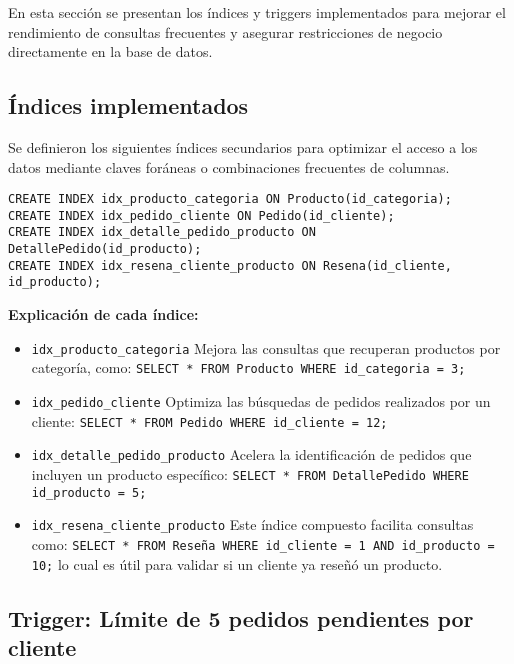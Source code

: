 En esta sección se presentan los índices y triggers implementados para mejorar el rendimiento de consultas frecuentes y asegurar restricciones de negocio directamente en la base de datos.

\subsection{Índices implementados}

Se definieron los siguientes índices secundarios para optimizar el acceso a los datos mediante claves foráneas o combinaciones frecuentes de columnas.

\begin{lstlisting}
CREATE INDEX idx_producto_categoria ON Producto(id_categoria);
CREATE INDEX idx_pedido_cliente ON Pedido(id_cliente);
CREATE INDEX idx_detalle_pedido_producto ON DetallePedido(id_producto);
CREATE INDEX idx_resena_cliente_producto ON Resena(id_cliente, id_producto);
\end{lstlisting}

\textbf{Explicación de cada índice:}

\begin{itemize}
  \item \texttt{idx\_producto\_categoria}  
  Mejora las consultas que recuperan productos por categoría, como:  
  \texttt{SELECT * FROM Producto WHERE id\_categoria = 3;}
  
  \item \texttt{idx\_pedido\_cliente}  
  Optimiza las búsquedas de pedidos realizados por un cliente:  
  \texttt{SELECT * FROM Pedido WHERE id\_cliente = 12;}
  
  \item \texttt{idx\_detalle\_pedido\_producto}  
  Acelera la identificación de pedidos que incluyen un producto específico:  
  \texttt{SELECT * FROM DetallePedido WHERE id\_producto = 5;}
  
  \item \texttt{idx\_resena\_cliente\_producto}  
  Este índice compuesto facilita consultas como:  
  \texttt{SELECT * FROM Reseña WHERE id\_cliente = 1 AND id\_producto = 10;}  
  lo cual es útil para validar si un cliente ya reseñó un producto.
\end{itemize}

\subsection{Trigger: Límite de 5 pedidos pendientes por cliente}

